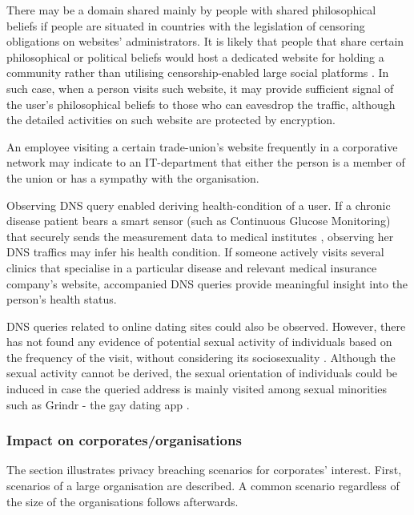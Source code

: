 There may be a domain shared mainly by people with shared philosophical beliefs if people are situated in countries with the legislation of censoring obligations on websites' administrators.
It is likely that people that share certain philosophical or political beliefs would host a dedicated website for holding a community rather than utilising censorship-enabled large social platforms \cite{mackinnon2009china}.
In such case, when a person visits such website, it may provide sufficient signal of the user's philosophical beliefs to those who can eavesdrop the traffic, although the detailed activities on such website are protected by encryption.

An employee visiting a certain trade-union's website frequently in a corporative network may indicate to an IT-department that either the person is a member of the union or has a sympathy with the organisation. 

Observing DNS query enabled deriving health-condition of a user. If a chronic disease patient bears a smart sensor (such as Continuous Glucose Monitoring) that securely sends the measurement data to medical institutes \cite{carelink-uploading, medtronic-watson}, observing her DNS traffics may infer his health condition.
If someone actively visits several clinics that specialise in a particular disease and relevant medical insurance company's website, accompanied DNS queries provide meaningful insight into the person's health status.

DNS queries related to online dating sites could also be observed. However, there has not found any evidence of potential sexual activity of individuals based on the frequency of the visit, without considering its sociosexuality \cite{sevi2018exploring}. 
Although the sexual activity cannot be derived, the sexual orientation of individuals could be induced in case the queried address is mainly visited among sexual minorities such as Grindr - the gay dating app \cite{goedel2015geosocial}.

\subsubsection{Impact on corporates/organisations}
The section illustrates privacy breaching scenarios for corporates' interest. First, scenarios of a large organisation are described. A common scenario regardless of the size of the organisations follows afterwards.

